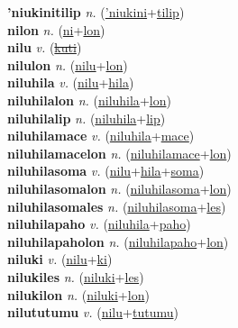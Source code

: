 \textbf{'niukinitilip} \textit{n.} (\hyperref['niukini]{'niukini}+\hyperref[tilip]{tilip})
 \label{'niukinitilip} \\
\textbf{nilon} \textit{n.} (\hyperref[ni]{ni}+\hyperref[lon]{lon})
 \label{nilon} \\
\textbf{nilu} \textit{v.} (\hyperref[kuti]{\sout{kuti}})
 \label{nilu} \\
\textbf{nilulon} \textit{n.} (\hyperref[nilu]{nilu}+\hyperref[lon]{lon})
 \label{nilulon} \\
\textbf{niluhila} \textit{v.} (\hyperref[nilu]{nilu}+\hyperref[hila]{hila})
 \label{niluhila} \\
\textbf{niluhilalon} \textit{n.} (\hyperref[niluhila]{niluhila}+\hyperref[lon]{lon})
 \label{niluhilalon} \\
\textbf{niluhilalip} \textit{n.} (\hyperref[niluhila]{niluhila}+\hyperref[lip]{lip})
 \label{niluhilalip} \\
\textbf{niluhilamace} \textit{v.} (\hyperref[niluhila]{niluhila}+\hyperref[mace]{mace})
 \label{niluhilamace} \\
\textbf{niluhilamacelon} \textit{n.} (\hyperref[niluhilamace]{niluhilamace}+\hyperref[lon]{lon})
 \label{niluhilamacelon} \\
\textbf{niluhilasoma} \textit{v.} (\hyperref[nilu]{nilu}+\hyperref[hila]{hila}+\hyperref[soma]{soma})
 \label{niluhilasoma} \\
\textbf{niluhilasomalon} \textit{n.} (\hyperref[niluhilasoma]{niluhilasoma}+\hyperref[lon]{lon})
 \label{niluhilasomalon} \\
\textbf{niluhilasomales} \textit{n.} (\hyperref[niluhilasoma]{niluhilasoma}+\hyperref[les]{les})
 \label{niluhilasomales} \\
\textbf{niluhilapaho} \textit{v.} (\hyperref[niluhila]{niluhila}+\hyperref[paho]{paho})
 \label{niluhilapaho} \\
\textbf{niluhilapaholon} \textit{n.} (\hyperref[niluhilapaho]{niluhilapaho}+\hyperref[lon]{lon})
 \label{niluhilapaholon} \\
\textbf{niluki} \textit{v.} (\hyperref[nilu]{nilu}+\hyperref[ki]{ki})
 \label{niluki} \\
\textbf{nilukiles} \textit{n.} (\hyperref[niluki]{niluki}+\hyperref[les]{les})
 \label{nilukiles} \\
\textbf{nilukilon} \textit{n.} (\hyperref[niluki]{niluki}+\hyperref[lon]{lon})
 \label{nilukilon} \\
\textbf{nilututumu} \textit{v.} (\hyperref[nilu]{nilu}+\hyperref[tutumu]{tutumu})
 \label{nilututumu} \\
